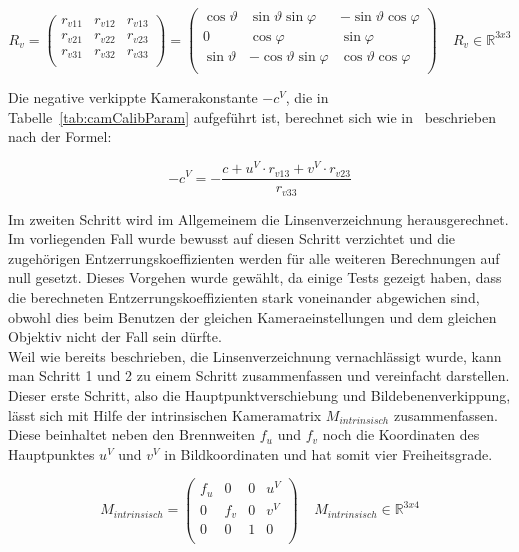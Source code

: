\begin{equation}
\label{equ:Rverkippt}
R_v = 
\begin{pmatrix}
r_{v11} & r_{v12} & r_{v13} \\
r_{v21} & r_{v22} & r_{v23} \\
r_{v31} & r_{v32} & r_{v33} \\
\end{pmatrix} = 
\begin{pmatrix}
\cos\vartheta & \sin\vartheta \sin\varphi & -\sin\vartheta \cos\varphi \\
0 & \cos\varphi & \sin\varphi\\
\sin\vartheta & -\cos\vartheta \sin\varphi & \cos\vartheta \cos\varphi \\
\end{pmatrix} 
~ ~ ~ ~ ~R_v \in \mathbb{R}^{3x3}
\end{equation}

Die negative verkippte Kamerakonstante $-c^V$, die in Tabelle~\ref{tab:camCalibParam} aufgeführt ist, berechnet sich wie in~\citep{Meisel:77890} beschrieben nach der Formel:

\begin{equation}
-c^V = - \frac{c+u^V \cdot r_{v13} + v^V \cdot r_{v23}}{r_{v33}}
\end{equation}

Im zweiten Schritt wird im Allgemeinem die Linsenverzeichnung herausgerechnet. Im vorliegenden Fall wurde bewusst auf diesen Schritt verzichtet und die zugehörigen Entzerrungskoeffizienten werden für alle weiteren Berechnungen auf null gesetzt. Dieses Vorgehen wurde gewählt, da einige Tests gezeigt haben, dass die berechneten Entzerrungskoeffizienten stark voneinander abgewichen sind, obwohl dies beim Benutzen der gleichen Kameraeinstellungen und dem gleichen Objektiv nicht der Fall sein dürfte.\\
Weil wie bereits beschrieben, die Linsenverzeichnung vernachlässigt wurde, kann man Schritt 1 und 2 zu einem Schritt zusammenfassen und vereinfacht darstellen. Dieser erste Schritt, also die Hauptpunktverschiebung und Bildebenenverkippung, lässt sich mit Hilfe der intrinsischen Kameramatrix $M_{intrinsisch}$ zusammenfassen. Diese beinhaltet neben den Brennweiten $f_u$ und $f_v$ noch die Koordinaten des Hauptpunktes $u^V$ und $v^V$ in Bildkoordinaten und hat somit vier Freiheitsgrade.

\begin{equation}
\label{equ:intrinsic}
M_{intrinsisch} = 
\begin{pmatrix}
f_u & 0 & 0 & u^V \\
0 & f_v & 0 & v^V\\
0 & 0 & 1 & 0 \\
\end{pmatrix} 
~ ~ ~ ~ ~M_{intrinsisch} \in \mathbb{R}^{3x4}
\end{equation}

